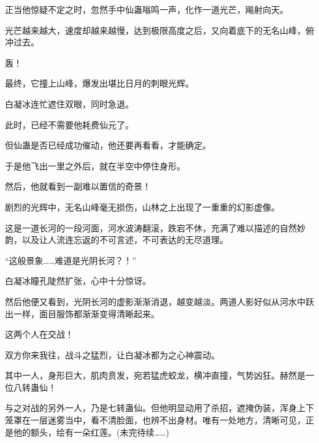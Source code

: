 \begin{this_body}
正当他惊疑不定之时，忽然手中仙蛊嗡鸣一声，化作一道光芒，飚射向天。

光芒越来越大，速度却越来越慢，达到极限高度之后，又向着底下的无名山峰，俯冲过去。

轰！

最终，它撞上山峰，爆发出堪比日月的刺眼光辉。

白凝冰连忙遮住双眼，同时急退。

此时，已经不需要他耗费仙元了。

但仙蛊是否已经成功催动，他还要再看看，才能确定。

于是他飞出一里之外后，就在半空中停住身形。

然后，他就看到一副难以置信的奇景！

剧烈的光辉中，无名山峰毫无损伤，山林之上出现了一重重的幻影虚像。

这是一道长河的一段河面，河水波涛翻滚，跌宕不休，充满了难以描述的自然妙韵，以及让人流连忘返的不可言述，不可表达的无尽道理。

“这般景象……难道是光阴长河？！”

白凝冰瞳孔陡然扩张，心中十分惊讶。

然后他便又看到，光阴长河的虚影渐渐消退，越变越淡。两道人影好似从河水中跃出一样，面目服饰都渐渐变得清晰起来。

这两个人在交战！

双方你来我往，战斗之猛烈，让白凝冰都为之心神震动。

其中一人，身形巨大，肌肉贲发，宛若猛虎蛟龙，横冲直撞，气势凶狂。赫然是一位八转蛊仙！

与之对战的另外一人，乃是七转蛊仙。但他明显动用了杀招，遮掩伪装，浑身上下笼罩在一层迷雾当中，看不清脸面，也辨不出身材。唯有一处地方，清晰可见，正是他的额头，绘有一朵红莲。(未完待续……)

\end{this_body}

